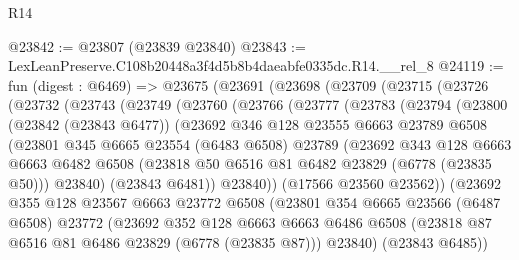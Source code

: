 \begin{lexlean}{R14}
\begin{coremodule}
@23842 := @23807 (@23839 @23840)
@23843 := LexLeanPreserve.C108b20448a3f4d5b8b4daeabfe0335dc.R14.__rel_8
@24119 := fun (digest : @6469) =>
  @23675
    (@23691
      (@23698
        (@23709
          (@23715
            (@23726
              (@23732
                (@23743
                  (@23749
                    (@23760
                      (@23766
                        (@23777
                          (@23783
                            (@23794
                              (@23800
                                (@23842 (@23843 @6477))
                                (@23692
                                  @346
                                  @128
                                  @23555
                                  @6663
                                  @23789
                                  @6508
                                  (@23801
                                    @345
                                    @6665
                                    @23554
                                    (@6483 @6508)
                                    @23789
                                    (@23692
                                      @343
                                      @128
                                      @6663
                                      @6663
                                      @6482
                                      @6508
                                      (@23818 @50 @6516 @81 @6482 @23829 (@6778 (@23835 @50)))
                                      @23840)
                                    (@23843 @6481))
                                  @23840))
                              (@17566 @23560 @23562))
                            (@23692
                              @355
                              @128
                              @23567
                              @6663
                              @23772
                              @6508
                              (@23801
                                @354
                                @6665
                                @23566
                                (@6487 @6508)
                                @23772
                                (@23692
                                  @352
                                  @128
                                  @6663
                                  @6663
                                  @6486
                                  @6508
                                  (@23818 @87 @6516 @81 @6486 @23829 (@6778 (@23835 @87)))
                                  @23840)
                                (@23843 @6485))

\end{coremodule}
\end{lexlean}
